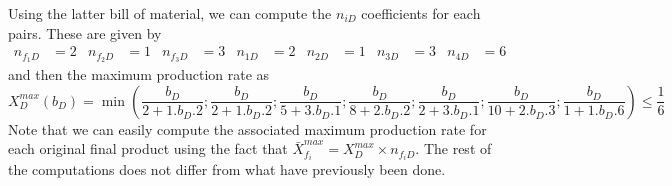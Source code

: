 Using the latter bill of material, we can compute the $n_{iD}$ coefficients for each pairs. These are given by \begin{align*} n_{f_1D} &= 2 & n_{f_2D} &= 1 & n_{f_3D} &= 3 & n_{1D} &= 2 & n_{2D} &= 1 & n_{3D} &= 3 & n_{4D} &= 6 \end{align*} and then the maximum production rate as \[
    X_D^{max}(b_D) = \min\left(
        \frac{b_D}{2+1.b_D.2} ; 
        \frac{b_D}{2+1.b_D.2} ; 
        \frac{b_D}{5+3.b_D.1} ; 
        \frac{b_D}{8+2.b_D.2} ; 
        \frac{b_D}{2+3.b_D.1} ; 
        \frac{b_D}{10+2.b_D.3} ; 
        \frac{b_D}{1+1.b_D.6}
    \right) \le \frac{1}{6}
\]
Note that we can easily compute the associated maximum production rate for each original final product using the fact that $\bar X_{f_i}^{max} = X_D^{max}\times n_{f_iD}$. The rest of the computations does not differ from what have previously been done. 
